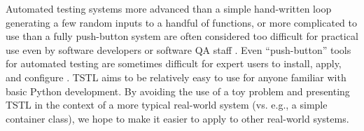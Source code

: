 Automated testing systems more advanced than a simple hand-written
loop generating a few random inputs to a handful of functions, or more
complicated to use than a fully push-button system are often
considered too difficult for practical use even by software developers
or software QA staff \cite{ISSRE12}. Even ``push-button'' tools for
automated testing are sometimes difficult for expert users to install,
apply, and configure \cite{AMAI,CFV08,ISSRE12}.  TSTL aims to be
relatively easy to use for anyone familiar with basic Python
development.  By avoiding the use of a toy problem and presenting TSTL
in the context of a more typical real-world system (vs. e.g., a simple
container class), we hope to make it easier to apply to other
real-world systems.



